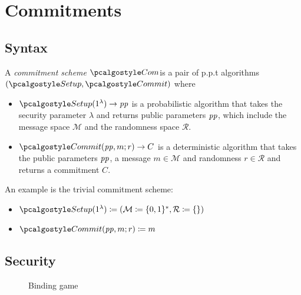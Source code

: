 \section{Commitments}\label{sec:commitments}


\subsection{Syntax}
\begin{definition}
  A \emph{commitment scheme} $\algo{Com}$is a pair of p.p.t algorithms $(\algo{Setup}, \algo{Commit})$ where
  \begin{itemize}
    \item $\algo{Setup}(1^\lambda) \rightarrow \params$ is a probabilistic algorithm that takes the security parameter $\lambda$ and returns public parameters $\mathit{pp}$, which include the message space $\mathcal{M}$ and the randomness space $\mathcal{R}$.
    \item $\algo{Commit}(\params, m; r) \rightarrow C$ is a deterministic algorithm that takes the public parameters $\mathit{pp}$, a message $m \in \mathcal{M}$ and randomness $r \in \mathcal{R}$ and returns a commitment $C$.
  \end{itemize}
\end{definition}

\begin{example}
  An example is the trivial commitment scheme\label{sec:trivial-com}:
  \begin{itemize}
    \item $\algo{Setup}(1^\lambda) \defeq (\mathcal{M} \defeq \{0, 1\}^*, \mathcal{R} \defeq \{\})$
    \item $\algo{Commit}(\params,m;r) \defeq m$
  \end{itemize}
\end{example}

\subsection{Security}

\begin{figure}[tbhp]
  \begin{center}
    \begin{tcolorbox}[width=8cm]
      \begin{pchstack}[center]
      \end{pchstack}
    \end{tcolorbox}
  \end{center}
  \caption{Binding game \label{fig:break-com-bind}}
\end{figure}

